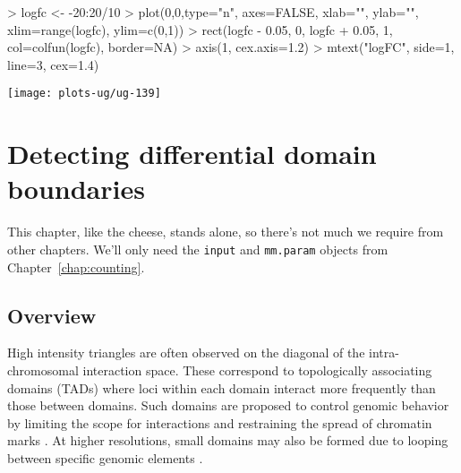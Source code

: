 \documentclass[12pt]{report}
\renewenvironment{Schunk}{\vspace{0pt}}{\vspace{0pt}}
\newcommand{\code}[1]{{\small\texttt{#1}}}
\newenvironment{combox}
{ \begin{shaded}\begin{center}\begin{minipage}[t]{0.95\textwidth} }
{ \end{minipage}\end{center}\end{shaded} }
\begin{document}
\begin{Schunk}
\begin{Sinput}
> logfc <- -20:20/10
> plot(0,0,type="n", axes=FALSE, xlab="", ylab="", xlim=range(logfc), ylim=c(0,1))
> rect(logfc - 0.05, 0, logfc + 0.05, 1, col=colfun(logfc), border=NA)
> axis(1, cex.axis=1.2)
> mtext("logFC", side=1, line=3, cex=1.4)
\end{Sinput}
\end{Schunk}

\begin{center}
\texttt{[image: plots-ug/ug-139]}
\end{center}


\chapter{Detecting differential domain boundaries}
\label{chap:domains}
\begin{combox}
This chapter, like the cheese, stands alone, so there's not much we require from other chapters.
We'll only need the \code{input} and \code{mm.param} objects from Chapter~\ref{chap:counting}.
\end{combox}

\section{Overview}
High intensity triangles are often observed on the diagonal of the intra-chromosomal interaction space.
These correspond to topologically associating domains (TADs) where loci within each domain interact more frequently than those between domains.
Such domains are proposed to control genomic behavior by limiting the scope for interactions and restraining the spread of chromatin marks \citep{nora2013segmental}.
At higher resolutions, small domains may also be formed due to looping between specific genomic elements \citep{rao2014kilobase}.
\end{document}
